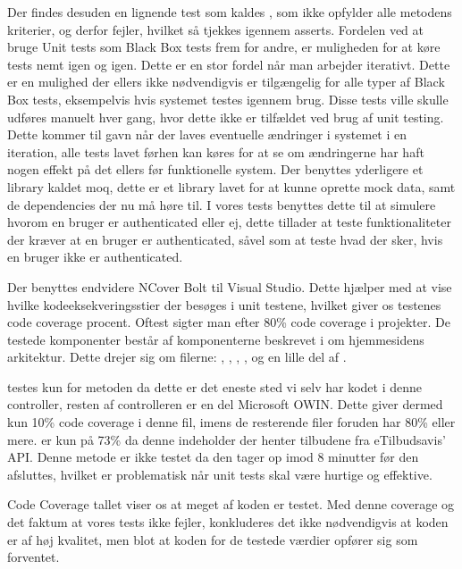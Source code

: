 Der findes desuden en lignende test som kaldes , som ikke opfylder alle metodens kriterier, og derfor fejler, hvilket så tjekkes igennem asserts.
Fordelen ved at bruge Unit tests som Black Box tests frem for andre, er muligheden for at køre tests nemt igen og igen.
Dette er en stor fordel når man arbejder iterativt.
Dette er en mulighed der ellers ikke nødvendigvis er tilgængelig for alle typer af Black Box tests, eksempelvis hvis systemet testes igennem brug.
Disse tests ville skulle udføres manuelt hver gang, hvor dette ikke er tilfældet ved brug af unit testing.
Dette kommer til gavn når der laves eventuelle ændringer i systemet i en iteration, alle tests lavet førhen kan køres for at se om ændringerne har haft nogen effekt på det ellers før funktionelle system. 
Der benyttes yderligere et library kaldet moq, dette er et library lavet for at kunne oprette mock data, samt de dependencies der nu må høre til.
I vores tests benyttes dette til at simulere hvorom en bruger er authenticated eller ej, dette tillader at teste funktionaliteter der kræver at en bruger er authenticated, såvel som at teste hvad der sker, hvis en bruger ikke er authenticated.

Der benyttes endvidere NCover Bolt til Visual Studio. 
Dette hjælper med at vise hvilke kodeeksekveringsstier der besøges i unit testene, hvilket giver os testenes code coverage procent.
Oftest sigter man efter 80\% code coverage i projekter. \citep{Code_Coverage}
De testede komponenter består af komponenterne beskrevet i  om hjemmesidens arkitektur.
Dette drejer sig om filerne: , , , ,  og en lille del af .

 testes kun for metoden  da dette er det eneste sted vi selv har kodet i denne controller, resten af controlleren er en del Microsoft OWIN.
Dette giver dermed kun 10\% code coverage i denne fil, imens de resterende filer foruden   har 80\% eller mere.
 er kun på 73\% da denne indeholder  der henter tilbudene fra eTilbudsavis' API. 
Denne metode er ikke testet da den tager op imod 8 minutter før den afsluttes, hvilket er problematisk når unit tests skal være hurtige og effektive.

Code Coverage tallet viser os at meget af koden er testet.
Med denne coverage og det faktum at vores tests ikke fejler, konkluderes det ikke nødvendigvis at koden er af høj kvalitet, men blot at koden for de testede værdier opfører sig som forventet.
